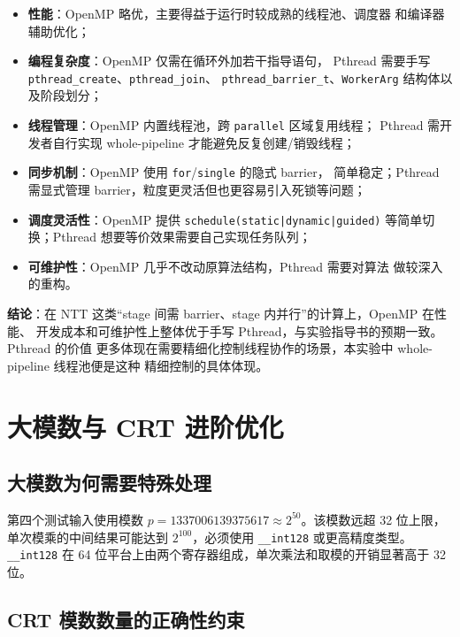 \documentclass[UTF8,a4paper,10pt]{ctexart}
\begin{document}
\begin{itemize}
  \item \textbf{性能}：OpenMP 略优，主要得益于运行时较成熟的线程池、调度器
        和编译器辅助优化；
  \item \textbf{编程复杂度}：OpenMP 仅需在循环外加若干指导语句，
        Pthread 需要手写 \texttt{pthread\_create}、\texttt{pthread\_join}、
        \texttt{pthread\_barrier\_t}、\texttt{WorkerArg} 结构体以及阶段划分；
  \item \textbf{线程管理}：OpenMP 内置线程池，跨 \texttt{parallel} 区域复用线程；
        Pthread 需开发者自行实现 whole-pipeline 才能避免反复创建/销毁线程；
  \item \textbf{同步机制}：OpenMP 使用 \texttt{for}/\texttt{single} 的隐式 barrier，
        简单稳定；Pthread 需显式管理 barrier，粒度更灵活但也更容易引入死锁等问题；
  \item \textbf{调度灵活性}：OpenMP 提供 \texttt{schedule(static|dynamic|guided)}
        等简单切换；Pthread 想要等价效果需要自己实现任务队列；
  \item \textbf{可维护性}：OpenMP 几乎不改动原算法结构，Pthread 需要对算法
        做较深入的重构。
\end{itemize}

\textbf{结论}：在 NTT 这类``stage 间需 barrier、stage 内并行''的计算上，OpenMP 在性能、
开发成本和可维护性上整体优于手写 Pthread，与实验指导书的预期一致。Pthread 的价值
更多体现在需要精细化控制线程协作的场景，本实验中 whole-pipeline 线程池便是这种
精细控制的具体体现。

\section{大模数与 CRT 进阶优化}

\subsection{大模数为何需要特殊处理}

第四个测试输入使用模数 $p = 1337006139375617 \approx 2^{50}$。该模数远超 32 位上限，
单次模乘的中间结果可能达到 $2^{100}$，必须使用 \texttt{\_\_int128} 或更高精度类型。
\texttt{\_\_int128} 在 64 位平台上由两个寄存器组成，单次乘法和取模的开销显著高于 32 位。


\subsection{CRT 模数数量的正确性约束}
\end{document}
